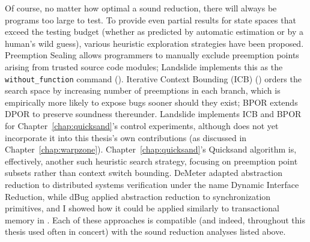 Of course, no matter how optimal a sound reduction, there will always be programs too large to test.
To provide even partial results for state spaces that exceed the testing budget
(whether as predicted by automatic estimation \cite{estimation} or by a human's wild guess),
various heuristic exploration strategies have been proposed.
Preemption Sealing \cite{sealing} allows programmers to manually exclude preemption points
arising from trusted source code modules;
Landslide implements this as the {\tt without\_function} command (\sect{\ref{sec:landslide-pps}}).
Iterative Context Bounding (ICB) \cite{chess-icb} (\sect{\ref{sec:landslide-icb}})
orders the search space by increasing number of preemptions in each branch,
which is empirically more likely to expose bugs sooner should they exist;
BPOR \cite{bpor} extends DPOR to preserve soundness
thereunder. %
Landslide implements ICB and BPOR for Chapter~\ref{chap:quicksand}'s control experiments,
although does not yet incorporate it into this thesis's own contributions
(as discussed in Chapter~\ref{chap:warpzone}).
Chapter~\ref{chap:quicksand}'s Quicksand algorithm is, effectively, another such heuristic search strategy,
focusing on preemption point subsets rather than context switch bounding.
DeMeter \cite{demeter} adapted abstraction reduction to distributed systems verification under the name Dynamic Interface Reduction,
while dBug \cite{dbug-phdthesis} applied abstraction reduction to synchronization primitives,
and I showed how it could be applied similarly to transactional memory in \sect{\ref{sec:tm-abstraction}}.
Each of these approaches is compatible (and indeed, throughout this thesis used often in concert)
with the sound reduction analyses listed above.





